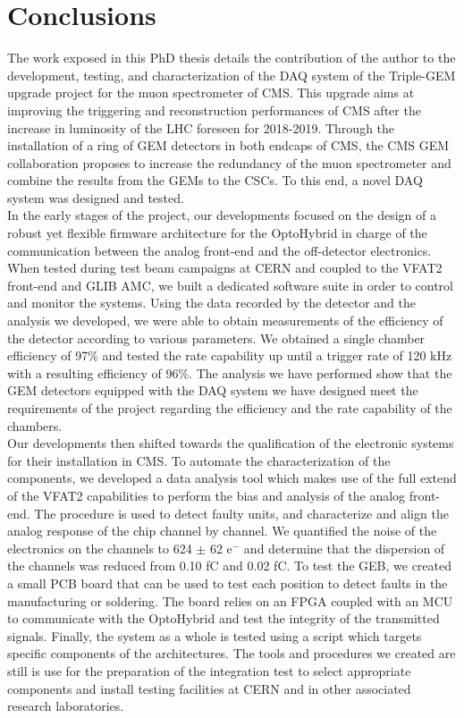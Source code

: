 \chapter*{Conclusions}
\label{chap:IV-0-conclusions}

  The work exposed in this PhD thesis details the contribution of the author to the development, testing, and characterization of the DAQ system of the Triple-GEM upgrade project for the muon spectrometer of CMS. This upgrade aims at improving the triggering and reconstruction performances of CMS after the increase in luminosity of the LHC foreseen for 2018-2019. Through the installation of a ring of GEM detectors in both endcaps of CMS, the CMS GEM collaboration proposes to increase the redundancy of the muon spectrometer and combine the results from the GEMs to the CSCs. To this end, a novel DAQ system was designed and tested. \\

  In the early stages of the project, our developments focused on the design of a robust yet flexible firmware architecture for the OptoHybrid in charge of the communication between the analog front-end and the off-detector electronics. When tested during test beam campaigns at CERN and coupled to the VFAT2 front-end and GLIB AMC, we built a dedicated software suite in order to control and monitor the systems. Using the data recorded by the detector and the analysis we developed, we were able to obtain measurements of the efficiency of the detector according to various parameters. We obtained a single chamber efficiency of 97\% and tested the rate capability up until a trigger rate of 120 kHz with a resulting efficiency of 96\%. The analysis we have performed show that the GEM detectors equipped with the DAQ system we have designed meet the requirements of the project regarding the efficiency and the rate capability of the chambers. \\

  Our developments then shifted towards the qualification of the electronic systems for their installation in CMS. To automate the characterization of the components, we developed a data analysis tool which makes use of the full extend of the VFAT2 capabilities to perform the bias and analysis of the analog front-end. The procedure is used to detect faulty units, and characterize and align the analog response of the chip channel by channel. We quantified the noise of the electronics on the channels to 624 $\pm$ 62 e$^-$ and determine that the dispersion of the channels was reduced from 0.10 fC and 0.02 fC. To test the GEB, we created a small PCB board that can be used to test each position to detect faults in the manufacturing or soldering. The board relies on an FPGA coupled with an MCU to communicate with the OptoHybrid and test the integrity of the transmitted signals. Finally, the system as a whole is tested using a script which targets specific components of the architectures. The tools and procedures we created are still is use for the preparation of the integration test to select appropriate components and install testing facilities at CERN and in other associated research laboratories. \\

